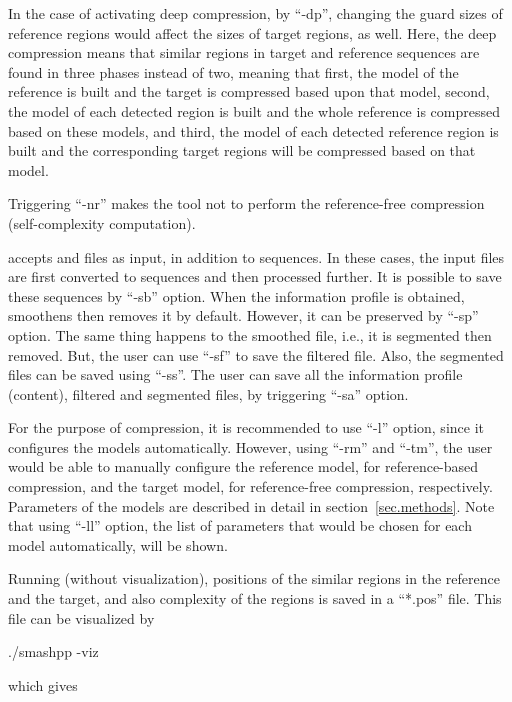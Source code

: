 In the case of activating deep compression, by ``-dp'', changing the guard sizes of reference regions would affect the sizes of target regions, as well. Here, the deep compression means that similar regions in target and reference sequences are found in three phases instead of two, meaning that first, the model of the reference is built and the target is compressed based upon that model, second, the model of each detected region is built and the whole reference is compressed based on these models, and third, the model of each detected reference region is built and the corresponding target regions will be compressed based on that model.

Triggering ``-nr'' makes the tool not to perform the reference-free compression (self-complexity computation).

\smashpp accepts \fasta and \fastq files as input, in addition to sequences. In these cases, the input files are first converted to sequences and then processed further. It is possible to save these sequences by ``-sb'' option.
When the information profile is obtained, \smashpp smoothens then removes it by default. However, it can be preserved by ``-sp'' option.
The same thing happens to the smoothed file, i.e., it is segmented then removed. But, the user can use ``-sf'' to save the filtered file. 
Also, the segmented files can be saved using ``-ss''. 
The user can save all the information profile (content), filtered and segmented files, by triggering ``-sa'' option.

For the purpose of compression, it is recommended to use ``-l'' option, since it configures the models automatically. However, using ``-rm'' and ``-tm'', the user would be able to manually configure the reference model, for reference-based compression, and the target model, for reference-free compression, respectively. Parameters of the models are described in detail in section~\ref{sec.methods}.
Note that using ``-ll'' option, the list of parameters that would be chosen for each model automatically, will be shown.

Running \smashpp (without visualization), positions of the similar regions in the reference and the target, and also complexity of the regions is saved in a ``*.pos'' file. This file can be visualized by
\begin{code}[style=bash]
  ./smashpp -viz
\end{code}
which gives

